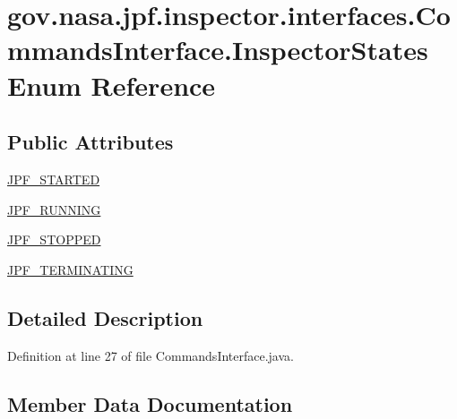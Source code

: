 \hypertarget{enumgov_1_1nasa_1_1jpf_1_1inspector_1_1interfaces_1_1_commands_interface_1_1_inspector_states}{}\section{gov.\+nasa.\+jpf.\+inspector.\+interfaces.\+Commands\+Interface.\+Inspector\+States Enum Reference}
\label{enumgov_1_1nasa_1_1jpf_1_1inspector_1_1interfaces_1_1_commands_interface_1_1_inspector_states}
\subsection*{Public Attributes}
\begin{DoxyCompactItemize}
\item 
\hyperlink{enumgov_1_1nasa_1_1jpf_1_1inspector_1_1interfaces_1_1_commands_interface_1_1_inspector_states_a0c93e9277b93ac60324259e5ccae5d1b}{J\+P\+F\+\_\+\+S\+T\+A\+R\+T\+ED}
\item 
\hyperlink{enumgov_1_1nasa_1_1jpf_1_1inspector_1_1interfaces_1_1_commands_interface_1_1_inspector_states_aecb3fcd5c1dc3e15ae1a2dfcfb2cb3cf}{J\+P\+F\+\_\+\+R\+U\+N\+N\+I\+NG}
\item 
\hyperlink{enumgov_1_1nasa_1_1jpf_1_1inspector_1_1interfaces_1_1_commands_interface_1_1_inspector_states_a63e33a2ed587c9bf523154e85100e6bd}{J\+P\+F\+\_\+\+S\+T\+O\+P\+P\+ED}
\item 
\hyperlink{enumgov_1_1nasa_1_1jpf_1_1inspector_1_1interfaces_1_1_commands_interface_1_1_inspector_states_a3c4bb56ddbe380b75500261d0eed34d5}{J\+P\+F\+\_\+\+T\+E\+R\+M\+I\+N\+A\+T\+I\+NG}
\end{DoxyCompactItemize}


\subsection{Detailed Description}


Definition at line 27 of file Commands\+Interface.\+java.



\subsection{Member Data Documentation}
